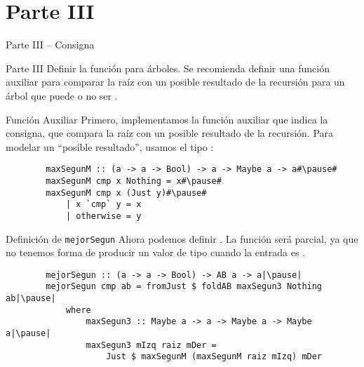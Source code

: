 \section{Parte III}

\begin{frame}{Parte III -- Consigna}
    \begin{exampleblock}{Parte III}
        Definir la función  para árboles. Se recomienda definir una función auxiliar para comparar la raíz con un posible resultado de la recursión para un árbol que puede o no ser .
    \end{exampleblock}
\end{frame}

\begin{frame}[fragile]{Función Auxiliar}
    Primero, implementamos la función auxiliar que indica la consigna, que compara la raíz con un posible resultado de la recursión. Para modelar un ``posible resultado'', usamos el tipo :

    \pause

    \begin{verbatim}
        maxSegunM :: (a -> a -> Bool) -> a -> Maybe a -> a#\pause#
        maxSegunM cmp x Nothing = x#\pause#
        maxSegunM cmp x (Just y)#\pause#
            | x `cmp` y = x
            | otherwise = y
    \end{verbatim}
\end{frame}

\begin{frame}[fragile]{Definición de \texttt{mejorSegun}}
    Ahora podemos definir . La función será \alert{parcial}, ya que no tenemos forma de producir un valor de tipo  cuando la entrada es .

    \pause

    \begin{verbatim}
        mejorSegun :: (a -> a -> Bool) -> AB a -> a|\pause|
        mejorSegun cmp ab = fromJust $ foldAB maxSegun3 Nothing ab|\pause|
            where
                maxSegun3 :: Maybe a -> a -> Maybe a -> Maybe a|\pause|
                maxSegun3 mIzq raiz mDer =
                    Just $ maxSegunM (maxSegunM raiz mIzq) mDer
    \end{verbatim}
\end{frame}
